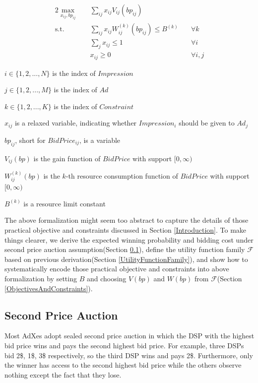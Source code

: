 \documentclass{article}
\newcommand{\sumj}{\sum\limits_j}
\newcommand{\sumij}{\sum\limits_{ij}}
\newcommand{\sx}{x_{ij}}
\newcommand{\sbp}{bp_{ij}}
\newcommand{\sV}{V_{ij}}
\newcommand{\sW}{W_{ij}^{(k)}}
\newcommand{\sB}{B^{(k)}}
\newcommand{\inRange}[1]{\in\{1,2,...,#1\}}
\newcommand{\uff}{\mathscr{F}}
\newcommand{\dspresourceconstraint}{\sumij \sx \sW(\sbp) \le \sB}
\newcommand{\assignmentconstraint}{\sumj \sx \le 1}
\begin{document}
\begin{alignat}{2}
    \max\limits_{\sx, \sbp} \quad & \sumij \sx \sV(\sbp) \quad    & {} \\
    \mbox{s.t.} \quad             & \dspresourceconstraint \quad  & \forall k \\
    \quad                         & \assignmentconstraint \quad   & \forall i \\
    \quad                         & \sx \ge 0 \quad               & \forall i,j
\end{alignat}

$i \inRange{N}$ is the index of $Impression$

$j \inRange{M}$ is the index of $Ad$

$k \inRange{K}$ is the index of $Constraint$

$\sx$ is a relaxed variable, indicating whether $Impression_i$ should be given to $Ad_j$

$\sbp$, short for $BidPrice_{ij}$, is a variable

$\sV(bp)$ is the gain function of $BidPrice$ with support $[0, \infty)$

$\sW(bp)$ is the $k$-th resource consumption function of $BidPrice$ with support $[0, \infty)$

$\sB$ is a resource limit constant

The above formalization might seem too abstract to capture the details of
    those practical objective and constraints discussed in Section \ref{Introduction}.
To make things clearer, we
    derive the expected winning probability and bidding cost
        under second price auction assumption(Section \ref{SecondPriceAuction}),
    define the utility function family $\uff$ based on previous derivation(Section \ref{UtilityFunctionFamily}),
    and show how to systematically encode those practical objective and constraints into above formalization
        by setting $B$ and choosing $V(bp)$ and $W(bp)$ from $\uff$(Section \ref{ObjectivesAndConstraints}).

\subsection{Second Price Auction} \label{SecondPriceAuction}

Most AdXes adopt sealed second price auction in which
    the DSP with the highest bid price wins and pays the second highest bid price.
For example, three DSPs bid 2\$, 1\$, 3\$ respectively, so the third DSP wins and pays 2\$. 
Furthermore, only the winner has access to the second highest bid price
    while the others observe nothing except the fact that they lose.
\end{document}

